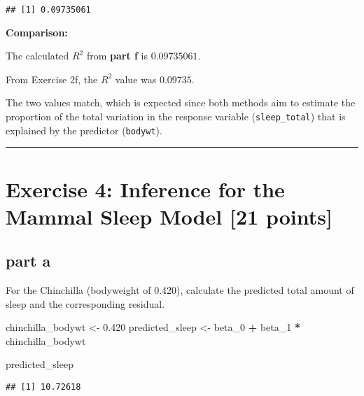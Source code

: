\documentclass[
]{article}
\newenvironment{Shaded}{\begin{snugshade}}{\end{snugshade}}
\newcommand{\FloatTok}[1]{\textcolor[rgb]{0.00,0.00,0.81}{#1}}
\newcommand{\NormalTok}[1]{#1}
\newcommand{\OtherTok}[1]{\textcolor[rgb]{0.56,0.35,0.01}{#1}}
\newcommand{\SpecialCharTok}[1]{\textcolor[rgb]{0.81,0.36,0.00}{\textbf{#1}}}
\newcommand{\StringTok}[1]{\textcolor[rgb]{0.31,0.60,0.02}{#1}}
\begin{document}
\begin{verbatim}
## [1] 0.09735061
\end{verbatim}

\textbf{Comparison:}

The calculated \(R^2\) from \textbf{part f} is \(0.09735061\).

From Exercise 2f, the \(R^2\) value was \(0.09735\).

The two values match, which is expected since both methods aim to
estimate the proportion of the total variation in the response variable
(\texttt{sleep\_total}) that is explained by the predictor
(\texttt{bodywt}).

\begin{center}\rule{0.5\linewidth}{0.5pt}\end{center}

\section{Exercise 4: Inference for the Mammal Sleep Model {[}21
points{]}}\label{exercise-4-inference-for-the-mammal-sleep-model-21-points}

\subsection{part a}\label{part-a-2}

For the Chinchilla (bodyweight of 0.420), calculate the predicted total
amount of sleep and the corresponding residual.

\begin{Shaded}
\begin{Highlighting}[]
\NormalTok{chinchilla\_bodywt }\OtherTok{\textless{}{-}} \FloatTok{0.420}
\NormalTok{predicted\_sleep }\OtherTok{\textless{}{-}}\NormalTok{ beta\_0 }\SpecialCharTok{+}\NormalTok{ beta\_1 }\SpecialCharTok{*}\NormalTok{ chinchilla\_bodywt}

\NormalTok{predicted\_sleep}
\end{Highlighting}
\end{Shaded}

\begin{verbatim}
## [1] 10.72618
\end{verbatim}

\begin{Shaded}
\end{Shaded}
\end{document}
